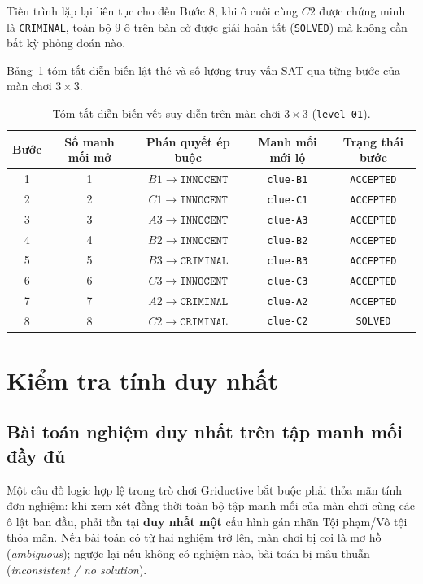 Tiến trình lặp lại liên tục cho đến Bước 8, khi ô cuối cùng $C2$ được chứng minh là \texttt{CRIMINAL}, toàn bộ 9 ô trên bàn cờ được giải hoàn tất (\texttt{SOLVED}) mà không cần bất kỳ phỏng đoán nào.

Bảng~\ref{tab:trace_summary_sample} tóm tắt diễn biến lật thẻ và số lượng truy vấn SAT qua từng bước của màn chơi $3 \times 3$.

\begin{table}[H]
    \centering
    \caption{Tóm tắt diễn biến vết suy diễn trên màn chơi $3 \times 3$ (\texttt{level\_01}).}
    \label{tab:trace_summary_sample}
    \begin{tabular}{|c|c|c|c|c|}
        \hline
        \textbf{Bước} & \textbf{Số manh mối mở} & \textbf{Phán quyết ép buộc} & \textbf{Manh mối mới lộ} & \textbf{Trạng thái bước} \\
        \hline
        1 & 1 & $B1 \to \texttt{INNOCENT}$ & \texttt{clue-B1} & \texttt{ACCEPTED} \\
        2 & 2 & $C1 \to \texttt{INNOCENT}$ & \texttt{clue-C1} & \texttt{ACCEPTED} \\
        3 & 3 & $A3 \to \texttt{INNOCENT}$ & \texttt{clue-A3} & \texttt{ACCEPTED} \\
        4 & 4 & $B2 \to \texttt{INNOCENT}$ & \texttt{clue-B2} & \texttt{ACCEPTED} \\
        5 & 5 & $B3 \to \texttt{CRIMINAL}$ & \texttt{clue-B3} & \texttt{ACCEPTED} \\
        6 & 6 & $C3 \to \texttt{INNOCENT}$ & \texttt{clue-C3} & \texttt{ACCEPTED} \\
        7 & 7 & $A2 \to \texttt{CRIMINAL}$ & \texttt{clue-A2} & \texttt{ACCEPTED} \\
        8 & 8 & $C2 \to \texttt{CRIMINAL}$ & \texttt{clue-C2} & \texttt{SOLVED} \\
        \hline
    \end{tabular}
\end{table}


\section{Kiểm tra tính duy nhất}
\label{sec:uniqueness}

\subsection{Bài toán nghiệm duy nhất trên tập manh mối đầy đủ}
Một câu đố logic hợp lệ trong trò chơi Griductive bắt buộc phải thỏa mãn tính đơn nghiệm: khi xem xét đồng thời toàn bộ tập manh mối của màn chơi cùng các ô lật ban đầu, phải tồn tại \textbf{duy nhất một} cấu hình gán nhãn Tội phạm/Vô tội thỏa mãn. Nếu bài toán có từ hai nghiệm trở lên, màn chơi bị coi là mơ hồ (\textit{ambiguous}); ngược lại nếu không có nghiệm nào, bài toán bị mâu thuẫn (\textit{inconsistent / no solution}).

